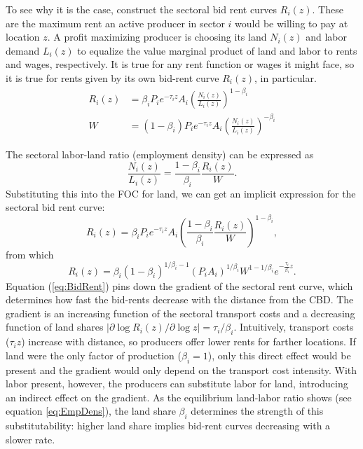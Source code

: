 \documentclass[12pt]{article}
\begin{document}
To see why it is the case, construct the sectoral bid rent curves $R_i(z)$. These are the maximum rent an active producer in sector $i$ would be willing to pay at location $z$. %
A profit maximizing producer is choosing its land $N_i(z)$ and labor demand $L_i(z)$ to equalize the value marginal product of land and labor to rents and wages, respectively. It is true for any rent function or wages it might face, so it is true for rents given by its own bid-rent curve $R_i(z)$, in particular.
\begin{align}
R_i(z) &=\beta_i P_ie^{-\tau_i z}A_i \left(\frac{N_i(z)}{L_i(z)}\right)^{1-\beta_i}\\
W &=(1-\beta_i) P_ie^{-\tau_i z}A_i \left(\frac{N_i(z)}{L_i(z)}\right)^{-\beta_i}
\end{align}

The sectoral labor-land ratio (employment density) can be expressed as
\begin{equation}
\label{eq:EmpDens}
\frac{N_i(z)}{L_i(z)} = \frac{1-\beta_i}{\beta_i}\frac{R_i(z)}{W}.
\end{equation}
Substituting this into the FOC for land, we can get an implicit expression for the sectoral bid rent curve:
\[
R_i(z) =\beta_i P_ie^{-\tau_i z}A_i \left(\frac{1-\beta_i}{\beta_i}\frac{R_i(z)}{W}\right)^{1-\beta_i},
\]
from which
\begin{equation}
\label{eq:BidRent}
R_i(z) =\beta_i(1-\beta_i)^{1/\beta_i-1} (P_iA_i)^{1/\beta_i} W^{1-1/\beta_i} e^{-\frac{\tau_i}{\beta_i} z}.
\end{equation}
Equation (\ref{eq:BidRent}) pins down the gradient of the sectoral rent curve, which determines how fast the bid-rents decrease with the distance from the CBD. The gradient is an increasing function of the sectoral transport costs and a decreasing function of land shares $|\partial\log R_i(z)/\partial \log z|=\tau_i/\beta_i$. Intuitively, transport costs ($\tau_iz$) increase with distance, so producers offer lower rents for farther locations. If land were the only factor of production ($\beta_i=1$), only this direct effect would be present and the gradient would only depend on the transport cost intensity. With labor present, however, the producers can substitute labor for land, introducing an indirect effect on the gradient. As the equilibrium land-labor ratio shows (see equation \ref{eq:EmpDens}), the land share $\beta_i$ determines the strength of this substitutability: higher land share implies bid-rent curves decreasing with a slower rate.
\end{document}
